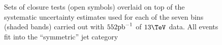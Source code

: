 \begin{figure}[h!]
  \begin{center}
     ~~
     \\
     ~~
     \\
    \caption{Sets of closure tests (open symbols) overlaid on top of
      the systematic uncertainty estimates used for each of the seven
      \scalht bins (shaded bands) carried out with $552\ipb$ of
      $13\tev$ data. All events fit into the ``symmetric'' jet
      category}
    \label{fig:closureDataSym}
  \end{center} 
\end{figure}

